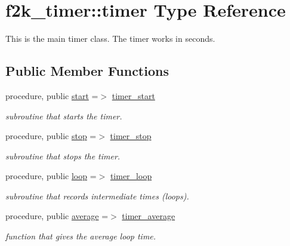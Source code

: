\hypertarget{structf2k__timer_1_1timer}{}\section{f2k\+\_\+timer\+:\+:timer Type Reference}
\label{structf2k__timer_1_1timer}


This is the main timer class. The timer works in seconds.  


\subsection*{Public Member Functions}
\begin{DoxyCompactItemize}
\item 
procedure, public \hyperlink{structf2k__timer_1_1timer_ab7982b51d7b764a438aaf9975d2b3bba}{start} =$>$ \hyperlink{namespacef2k__timer_a70057597d71664f70b9164c7d741c839}{timer\+\_\+start}
\begin{DoxyCompactList}\small\item\em subroutine that starts the timer. \end{DoxyCompactList}\item 
procedure, public \hyperlink{structf2k__timer_1_1timer_a113cdc3d059425bf1cef03381621633f}{stop} =$>$ \hyperlink{namespacef2k__timer_a9dcd2c81036ce32527bd3460606694b4}{timer\+\_\+stop}
\begin{DoxyCompactList}\small\item\em subroutine that stops the timer. \end{DoxyCompactList}\item 
procedure, public \hyperlink{structf2k__timer_1_1timer_a590c707c84550f49b2fd2b719bdf0be7}{loop} =$>$ \hyperlink{namespacef2k__timer_a605274108f4afabff1821ec1a1243575}{timer\+\_\+loop}
\begin{DoxyCompactList}\small\item\em subroutine that records intermediate times (loops). \end{DoxyCompactList}\item 
procedure, public \hyperlink{structf2k__timer_1_1timer_a21d4dc2135007d4b3d3ad03a189e4391}{average} =$>$ \hyperlink{namespacef2k__timer_a02dfc06ae09be917c91560357d92ab3f}{timer\+\_\+average}
\begin{DoxyCompactList}\small\item\em function that gives the average loop time. \end{DoxyCompactList}\item 

\end{DoxyCompactItemize}
